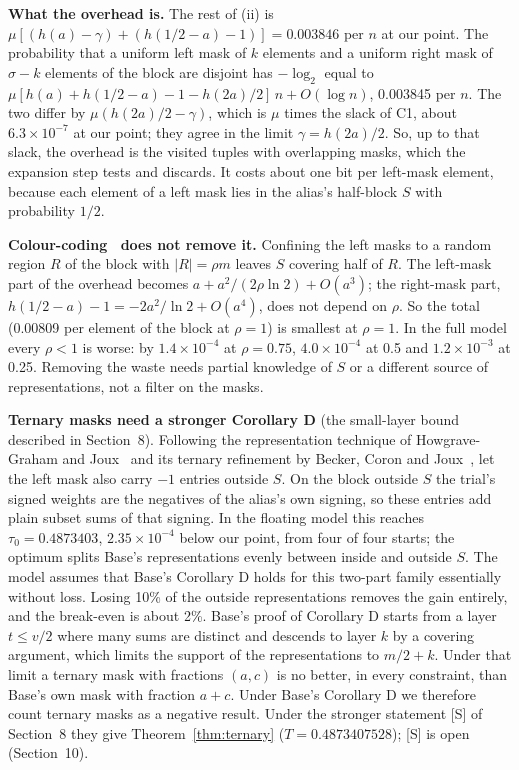 \documentclass[11pt]{article}
\theoremstyle{plain}
\begin{document}
\textbf{What the overhead is.} The rest of (ii) is $\mu[(h(a) - \gamma) + (h(1/2 - a) - 1)] = 0.003846$ per $n$ at our point. The probability that a uniform left mask of $k$ elements and a uniform right mask of $\sigma - k$ elements of the block are disjoint has $-\log_2$ equal to $\mu[h(a) + h(1/2 - a) - 1 - h(2a)/2]\,n + O(\log n)$, 0.003845 per $n$. The two differ by $\mu(h(2a)/2 - \gamma)$, which is $\mu$ times the slack of C1, about $6.3\times10^{-7}$ at our point; they agree in the limit $\gamma = h(2a)/2$. So, up to that slack, the overhead is the visited tuples with overlapping masks, which the expansion step tests and discards. It costs about one bit per left-mask element, because each element of a left mask lies in the alias's half-block $S$ with probability $1/2$.

\textbf{Colour-coding~\cite{ayz} does not remove it.} Confining the left masks to a random region $R$ of the block with $|R| = \rho m$ leaves $S$ covering half of $R$. The left-mask part of the overhead becomes $a + a^2/(2\rho \ln 2) + O(a^3)$; the right-mask part, $h(1/2 - a) - 1 = -2a^2/\ln 2 + O(a^4)$, does not depend on $\rho$. So the total (0.00809 per element of the block at $\rho = 1$) is smallest at $\rho = 1$. In the full model every $\rho < 1$ is worse: by $1.4\times10^{-4}$ at $\rho = 0.75$, $4.0\times10^{-4}$ at 0.5 and $1.2\times10^{-3}$ at 0.25. Removing the waste needs partial knowledge of $S$ or a different source of representations, not a filter on the masks.

\textbf{Ternary masks need a stronger Corollary D} (the small-layer bound described in Section~8). Following the representation technique of Howgrave-Graham and Joux~\cite{hgj} and its ternary refinement by Becker, Coron and Joux~\cite{bcj}, let the left mask also carry $-1$ entries outside $S$. On the block outside $S$ the trial's signed weights are the negatives of the alias's own signing, so these entries add plain subset sums of that signing. In the floating model this reaches $\tau_0 = 0.4873403$, $2.35\times10^{-4}$ below our point, from four of four starts; the optimum splits Base's representations evenly between inside and outside $S$. The model assumes that Base's Corollary D holds for this two-part family essentially without loss. Losing 10\% of the outside representations removes the gain entirely, and the break-even is about 2\%. Base's proof of Corollary D starts from a layer $t \le v/2$ where many sums are distinct and descends to layer $k$ by a covering argument, which limits the support of the representations to $m/2 + k$. Under that limit a ternary mask with fractions $(a, c)$ is no better, in every constraint, than Base's own mask with fraction $a + c$. Under Base's Corollary D we therefore count ternary masks as a negative result. Under the stronger statement [S] of Section~8 they give Theorem~\ref{thm:ternary} ($T = 0.4873407528$); [S] is open (Section~10).
\end{document}
